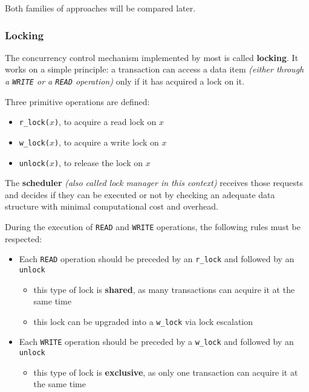 \documentclass[english]{article}
\begin{document}
Both families of approaches will be compared later.

\subsubsection{Locking}

The concurrency control mechanism implemented by most \dbms is called \textbf{locking}.
It works on a simple principle: a transaction can access a data item \textit{(either through a \texttt{WRITE} or a \texttt{READ} operation)} only if it has acquired a lock on it.

Three primitive operations are defined:

\begin{itemize}
  \item \texttt{r\_lock(\(x\))}, to acquire a read lock on \(x\)
  \item \texttt{w\_lock(\(x\))}, to acquire a write lock on \(x\)
  \item \texttt{unlock(\(x\))}, to release the lock on \(x\)
\end{itemize}

The \textbf{scheduler} \textit{(also called lock manager in this context)} receives those requests and decides if they can be executed or not by checking an adequate data structure with minimal computational cost and overhead.

During the execution of \texttt{READ} and \texttt{WRITE} operations, the following rules must be respected:

\begin{itemize}
  \item Each \texttt{READ} operation should be preceded by an \texttt{r\_lock} and followed by an \texttt{unlock}
        \begin{itemize}
          \item this type of lock is \textbf{shared}, as many transactions can acquire it at the same time
          \item this lock can be upgraded into a \texttt{w\_lock} via lock escalation
        \end{itemize}
  \item Each \texttt{WRITE} operation should be preceded by a \texttt{w\_lock} and followed by an \texttt{unlock}
        \begin{itemize}
          \item this type of lock is \textbf{exclusive}, as only one transaction can acquire it at the same time
        \end{itemize}
\end{itemize}
\end{document}
